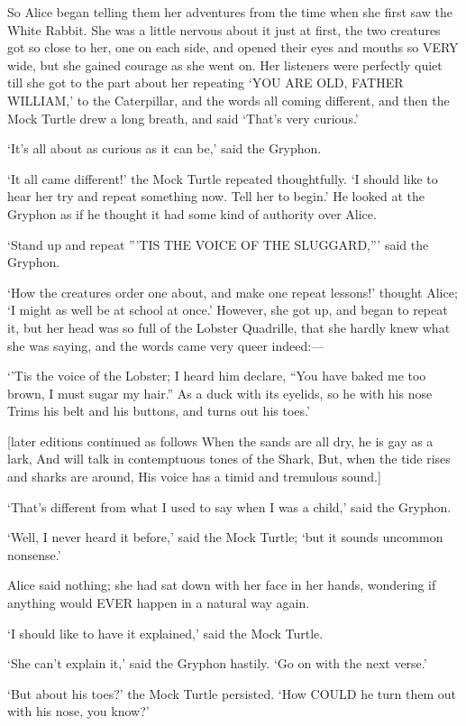 \documentclass[12pt]{book}
\begin{document}
\begin{Parallel}[p]{}{}
{So Alice began telling them her adventures from the time when she first saw the White Rabbit. She was a little nervous about it just at first, the two creatures got so close to her, one on each side, and opened their eyes and mouths so VERY wide, but she gained courage as she went on. Her listeners were perfectly quiet till she got to the part about her repeating ‘YOU ARE OLD, FATHER WILLIAM,’ to the Caterpillar, and the words all coming different, and then the Mock Turtle drew a long breath, and said ‘That’s very curious.’

‘It’s all about as curious as it can be,’ said the Gryphon.

‘It all came different!’ the Mock Turtle repeated thoughtfully. ‘I should like to hear her try and repeat something now. Tell her to begin.’ He looked at the Gryphon as if he thought it had some kind of authority over Alice.

‘Stand up and repeat ”’TIS THE VOICE OF THE SLUGGARD,”’ said the Gryphon.

‘How the creatures order one about, and make one repeat lessons!’ thought Alice; ‘I might as well be at school at once.’ However, she got up, and began to repeat it, but her head was so full of the Lobster Quadrille, that she hardly knew what she was saying, and the words came very queer indeed:—

  ‘’Tis the voice of the Lobster; I heard him declare,
  “You have baked me too brown, I must sugar my hair.”
  As a duck with its eyelids, so he with his nose
  Trims his belt and his buttons, and turns out his toes.’

       [later editions continued as follows
  When the sands are all dry, he is gay as a lark,
  And will talk in contemptuous tones of the Shark,
  But, when the tide rises and sharks are around,
  His voice has a timid and tremulous sound.]

‘That’s different from what I used to say when I was a child,’ said the Gryphon.

‘Well, I never heard it before,’ said the Mock Turtle; ‘but it sounds uncommon nonsense.’

Alice said nothing; she had sat down with her face in her hands, wondering if anything would EVER happen in a natural way again.

‘I should like to have it explained,’ said the Mock Turtle.

‘She can’t explain it,’ said the Gryphon hastily. ‘Go on with the next verse.’

‘But about his toes?’ the Mock Turtle persisted. ‘How COULD he turn them out with his nose, you know?’

}
\end{Parallel}
\end{document}
